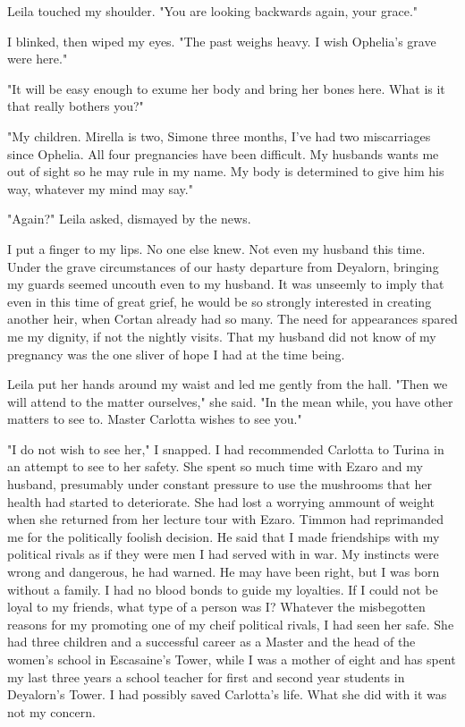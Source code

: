 \documentclass{article}
\begin{document}
Leila touched my shoulder. "You are looking backwards again, your grace."

I blinked, then wiped my eyes. "The past weighs heavy. I wish Ophelia's grave were here."

"It will be easy enough to exume her body and bring her bones here. What is it that really bothers you?"

"My children. Mirella is two, Simone three months, I've had two miscarriages since Ophelia. All four pregnancies have been difficult. My husbands wants me out of sight so he may rule in my name. My body is determined to give him his way, whatever my mind may say."

"Again?" Leila asked, dismayed by the news.

I put a finger to my lips. No one else knew. Not even my husband this time. Under the grave circumstances of our hasty departure from Deyalorn, bringing my guards seemed uncouth even to my husband. It was unseemly to imply that even in this time of great grief, he would be so strongly interested in creating another heir, when Cortan already had so many. The need for appearances spared me my dignity, if not the nightly visits. That my husband did not know of my pregnancy was the one sliver of hope I had at the time being. 

Leila put her hands around my waist and led me gently from the hall. "Then we will attend to the matter ourselves," she said. "In the mean while, you have other matters to see to. Master Carlotta wishes to see you."

"I do not wish to see her," I snapped. I had recommended Carlotta to Turina in an attempt to see to her safety. She spent so much time with Ezaro and my husband, presumably under constant pressure to use the mushrooms that her health had started to deteriorate. She had lost a worrying ammount of weight when she returned from her lecture tour with Ezaro. Timmon had reprimanded me for the politically foolish decision. He said that I made friendships with my political rivals as if they were men I had served with in war. My instincts were wrong and dangerous, he had warned. He may have been right, but I was born without a family. I had no blood bonds to guide my loyalties. If I could not be loyal to my friends, what type of a person was I? Whatever the misbegotten reasons for my promoting one of my cheif political rivals, I had seen her safe. She had three children and a successful career as a Master and the head of the women's school in Escasaine's Tower, while I was a mother of eight and has spent my last three years a school teacher for first and second year students in Deyalorn's Tower. I had possibly saved Carlotta's life. What she did with it was not my concern.
\end{document}
